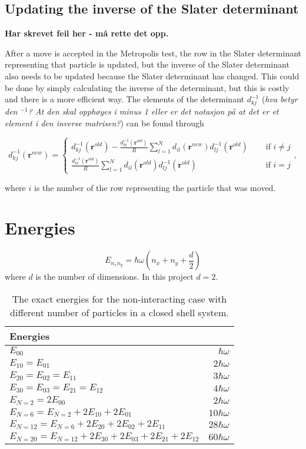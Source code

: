 \subsection{Updating the inverse of the Slater determinant}

\textbf{Har skrevet feil her - må rette det opp.}

After a move is accepted in the Metropolis test, the row in the Slater determinant representing that particle is updated, but the inverse of the Slater determinant also needs to be updated because the Slater determinant has changed. This could be done by simply calculating the inverse of the determinant, but this is costly and there is a more efficient way. The elements of the determinant $d_{kj}^{-1}$ (\textit{hva betyr den $^{-1}$? At den skal opphøyes i minus 1 eller er det notasjon på at det er et element i den inverse matrisen?}) can be found through

$$ d_{kj}^{-1}(\bm{r}^{new}) = \left\{ \begin{matrix}
d_{kj}^{-1}(\bm{r}^{old})- \frac{d_{ki}^{-1}(\bm{r}^{old})}{R}\sum_{l=1}^N d_{il}(\bm{r}^{new})d_{lj}^{-1}(\bm{r}^{old}) &\quad \text{ if } i \neq j \\
\frac{d_{ki}^{-1}(\bm{r}^{old})}{R}\sum_{l=1}^N d_{il}(\bm{r}^{old})d_{lj}^{-1}(\bm{r}^{old}) &\quad \text{ if } i = j
\end{matrix} \right. , $$

where $i$ is the number of the row representing the particle that was moved. 

\section{Energies}

\begin{equation}
E_{n_xn_y} = \hbar \omega (n_x + n_y + \frac{d}{2})
\end{equation} where $d$ is the number of dimensions. In this project $d=2$.

\begin{table}[H]\caption{The exact energies for the non-interacting case with different number of particles in a closed shell system.}\label{tab:exact_energies_non_interacting}
\center
\begin{tabular}{l|r}
Energies & \\ \hline
$E_{00}$ & $ \hbar \omega$ \\
$E_{10} = E_{01}$ & $2 \hbar \omega$\\
$E_{20} = E_{02} = E_{11}$ & $3 \hbar \omega$\\
$E_{30} = E_{03} = E_{21}= E_{12}$ & $4 \hbar \omega$\\ \hline
$E_{N=2} = 2E_{00}$ & $2 \hbar \omega$\\
$E_{N=6} = E_{N=2} + 2E_{10} + 2E_{01}$ &$ 10 \hbar \omega$\\
$E_{N=12} = E_{N=6} + 2E_{20} +2 E_{02} + 2E_{11}$ &$ 28 \hbar \omega$\\
$E_{N=20} = E_{N=12} + 2E_{30} + 2E_{03} + 2E_{21}+ 2E_{12}$ &$ 60 \hbar \omega$\\
\end{tabular}
\end{table}

